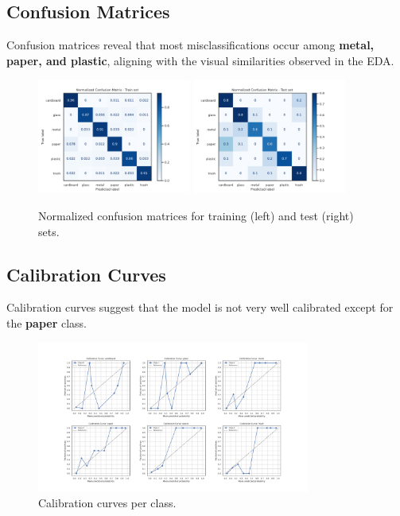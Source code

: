 \documentclass[12pt]{article}
\begin{document}
\subsection{Confusion Matrices}
Confusion matrices reveal that most misclassifications occur among \textbf{metal, paper, and plastic}, aligning with the visual similarities observed in the EDA. 

\begin{figure}[h!]
    \centering
    \includegraphics[width=0.45\textwidth]{figures/performance/confussion_mat_train_norm.pdf}
    \includegraphics[width=0.45\textwidth]{figures/performance/confussion_mat_test_norm.pdf}
    \caption{Normalized confusion matrices for training (left) and test (right) sets.}
    \label{fig:confusion}
\end{figure}

\newpage
\subsection{Calibration Curves}
Calibration curves suggest that the model is not very well calibrated except for the \textbf{paper} class.

\begin{figure}[h!]
    \centering
    \includegraphics[width=0.8\textwidth]{figures/performance/calibration_curves.pdf}
    \caption{Calibration curves per class.}
    \label{fig:calibration}
\end{figure}
\end{document}

